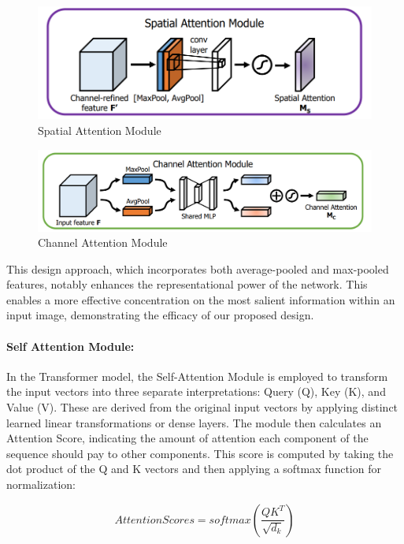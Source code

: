 \begin{figure}[htb]
    \centering
    \includegraphics[scale=.35]{figures/spatial_attention.png}
    \caption{Spatial Attention Module \cite{woo2018cbam}}
    \label{fig:my_label}
\end{figure}

\begin{figure}[htb]
    \centering
    \includegraphics[scale=.35]{figures/channel_attention.png}
    \caption{Channel Attention Module \cite{woo2018cbam}}
    \label{fig:my_label}
\end{figure}


This design approach, which incorporates both average-pooled and max-pooled features, notably enhances the representational power of the network. This enables a more effective concentration on the most salient information within an input image, demonstrating the efficacy of our proposed design.

\paragraph{Self Attention Module:}
In the Transformer model, the Self-Attention Module is employed to transform the input vectors into three separate interpretations: Query (Q), Key (K), and Value (V). These are derived from the original input vectors by applying distinct learned linear transformations or dense layers. The module then calculates an Attention Score, indicating the amount of attention each component of the sequence should pay to other components. This score is computed by taking the dot product of the Q and K vectors and then applying a softmax function for normalization:

\begin{equation}
    AttentionScores = softmax(\frac{QK^T}{\sqrt{d_k}})
\end{equation}

